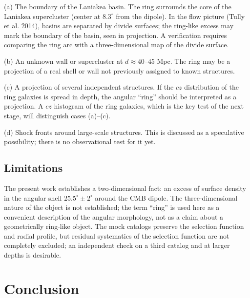 \documentclass[11pt,a4paper]{article}
\begin{document}
(a) The boundary of the Laniakea basin. The ring surrounds the core of the
Laniakea supercluster (center at \(8.3^\circ\) from the dipole).
In the flow picture (Tully et al. 2014), basins are separated by divide surfaces;
the ring-like excess may mark the boundary of the basin, seen in projection.
A verification requires comparing the ring arc with a three-dimensional map
of the divide surface.

(b) An unknown wall or supercluster at \(d \approx 40\)--\(45\) Mpc.
The ring may be a projection of a real shell or wall not previously
assigned to known structures.

(c) A projection of several independent structures. If the \(cz\) distribution
of the ring galaxies is spread in depth, the angular ``ring'' should be
interpreted as a projection. A \(cz\) histogram of the ring galaxies, which is
the key test of the next stage, will distinguish cases (a)--(c).

(d) Shock fronts around large-scale structures. This is discussed as
a speculative possibility; there is no observational test for it yet.

\subsection{Limitations}

The present work establishes a two-dimensional fact: an excess of surface
density in the angular shell \(25.5^\circ \pm 2^\circ\) around the CMB dipole.
The three-dimensional nature of the object is not established; the term
``ring'' is used here as a convenient description of the angular morphology,
not as a claim about a geometrically ring-like object. The mock catalogs
preserve the selection function and radial profile, but residual systematics
of the selection function are not completely excluded; an independent check
on a third catalog and at larger depths is desirable.

\section{Conclusion}
\end{document}
